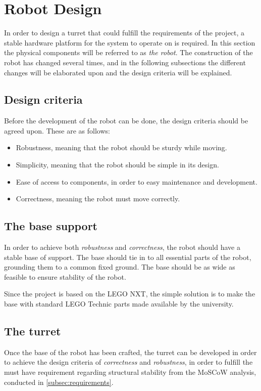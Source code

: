 \section{Robot Design}\label{Design:Robot}
In order to design a turret that could fulfill the requirements of the project, a stable hardware platform for the system to operate on is required. 
In this section the physical components will be referred to as \textit{the robot}.
The construction of the robot has changed several times, and in the following subsections the different changes will be elaborated upon and the design criteria will be explained. 

\subsection{Design criteria}
Before the development of the robot can be done, the design criteria should be agreed upon. 
These are as follows:
\begin{itemize}
    \item Robustness, meaning that the robot should be sturdy while moving.
    \item Simplicity, meaning that the robot should be simple in its design.
    \item Ease of access to components, in order to easy maintenance and development.
    \item Correctness, meaning the robot must move correctly.
\end{itemize}

\subsection{The base support}
In order to achieve both \textit{robustness} and \textit{correctness}, the robot should have a stable base of support. 
The base should tie in to all essential parts of the robot, grounding them to a common fixed ground.
The base should be as wide as feasible to ensure stability of the robot. 

Since the project is based on the LEGO NXT, the simple solution is to make the base with standard LEGO Technic parts made available by the university. 

\subsection{The turret}
Once the base of the robot has been crafted, the turret can be developed in order to achieve the design criteria of \textit{correctness} and \textit{robustness}, in order to fulfill the must have requirement regarding structural stability from the MoSCoW analysis, conducted in \autoref{subsec:requirements}. 

